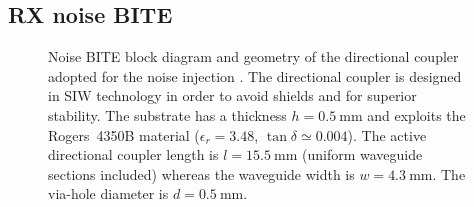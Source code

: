 \documentclass[conference,10pt,a4paper]{IEEEtran}%
\begin{document}
\subsection{RX noise BITE}
\label{sec-RX-noise-bite}
\begin{figure}[tb]
	\centering
	\caption{Noise BITE block diagram \protect{} and geometry of the directional coupler adopted for the noise injection \protect{}.
	The directional coupler is designed in SIW technology in order to avoid shields and for superior stability.
	The substrate has a thickness $h=\SI{0.5}{\milli\metre}$ and exploits the Rogers~4350B material ($\epsilon_{r}=3.48$, $\tan \delta \simeq 0.004$).
	The active directional coupler length is $l=\SI{15.5}{\mm}$ (uniform waveguide sections included) whereas the waveguide width is $w=\SI{4.3}{\mm}$.
	The via-hole diameter is $d=\SI{0.5}{\mm}$. }
	\label{fig-nbite-geo}
\end{figure}
\end{document}
